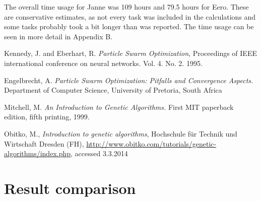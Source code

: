 \documentclass[twoside]{article}
\begin{document}
\begin{multicols}{2}
The overall time usage for Janne was 109 hours and 79.5 hours for Eero. These are conservative estimates, as not every task was included in the calculations and some tasks probably took a bit longer than was reported. The time usage can be seen in more detail in Appendix B.



\begin{thebibliography}{99} %
 Kennedy, J. and Eberhart, R.
  \emph{Particle Swarm Optimization},
 Proceedings of IEEE international conference on neural networks. Vol. 4. No. 2. 1995. 

 Engelbrecht, A. \emph{Particle Swarm Optimization: Pitfalls and Convergence Aspects.}
 Department of Computer Science, University of Pretoria, South Africa
 
Mitchell, M. \emph{An Introduction to Genetic Algorithms.} First MIT paperback edition, fifth printing, 1999. 
 
Obitko, M., \emph{Introduction to genetic algorithms}, Hochschule f\"ur Technik und Wirtschaft Dresden (FH), \url{http://www.obitko.com/tutorials/genetic-algorithms/index.php}, accessed 3.3.2014

\end{thebibliography}


\end{multicols}
\newpage
\appendix
\section{Result comparison}
\end{document}
